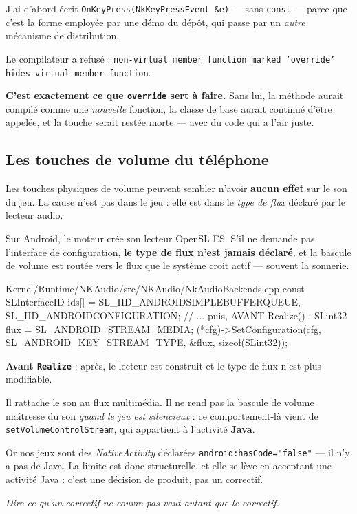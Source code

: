 \begin{nkpiege}
J'ai d'abord écrit \texttt{OnKeyPress(NkKeyPressEvent \&e)} --- sans
\texttt{const} --- parce que c'est la forme employée par une démo du dépôt, qui
passe par un \emph{autre} mécanisme de distribution.

Le compilateur a refusé :
\texttt{non-virtual member function marked 'override' hides virtual member
function}.

\textbf{C'est exactement ce que \texttt{override} sert à faire.} Sans lui, la
méthode aurait compilé comme une \emph{nouvelle} fonction, la classe de base
aurait continué d'être appelée, et la touche serait restée morte --- avec du code
qui a l'air juste.
\end{nkpiege}

\subsection{Les touches de volume du téléphone}

\begin{nkpiege}
Les touches physiques de volume peuvent sembler n'avoir \textbf{aucun effet} sur
le son du jeu. La cause n'est pas dans le jeu : elle est dans le \emph{type de
flux} déclaré par le lecteur audio.

Sur Android, le moteur crée son lecteur OpenSL ES. S'il ne demande pas
l'interface de configuration, \textbf{le type de flux n'est jamais déclaré}, et
la bascule de volume est routée vers le flux que le système croit actif ---
souvent la sonnerie.

\begin{nkcode}{Kernel/Runtime/NKAudio/src/NKAudio/NkAudioBackends.cpp}
const SLInterfaceID ids[] = {SL_IID_ANDROIDSIMPLEBUFFERQUEUE, SL_IID_ANDROIDCONFIGURATION};
// ... puis, AVANT Realize() :
SLint32 flux = SL_ANDROID_STREAM_MEDIA;
(*cfg)->SetConfiguration(cfg, SL_ANDROID_KEY_STREAM_TYPE, &flux, sizeof(SLint32));
\end{nkcode}

\textbf{Avant \texttt{Realize}} : après, le lecteur est construit et le type de
flux n'est plus modifiable.
\end{nkpiege}

\begin{nkretenir}
Il rattache le son au flux multimédia. Il ne rend pas la bascule de volume
maîtresse du son \emph{quand le jeu est silencieux} : ce comportement-là vient
de \texttt{setVolumeControlStream}, qui appartient à l'activité \textbf{Java}.

Or nos jeux sont des \emph{NativeActivity} déclarées
\texttt{android:hasCode="false"} --- il n'y a pas de Java. La limite est donc
structurelle, et elle se lève en acceptant une activité Java : c'est une décision
de produit, pas un correctif.

\emph{Dire ce qu'un correctif ne couvre pas vaut autant que le correctif.}
\end{nkretenir}

